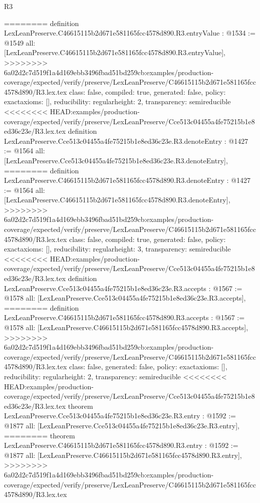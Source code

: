 \begin{lexlean}{R3}
\begin{coremodule}
{{{{{{{{{{{========
definition LexLeanPreserve.C46615115b2d671e581165fcc4578d890.R3.entryValue : @1534 := @1549 {
  all: [LexLeanPreserve.C46615115b2d671e581165fcc4578d890.R3.entryValue],
>>>>>>>> 6a02d2c7d519f1a4d169ebb3496fbad51bd259cb:examples/production-coverage/expected/verify/preserve/LexLeanPreserve/C46615115b2d671e581165fcc4578d890/R3.lex.tex
  class: false,
  compiled: true,
  generated: false,
  policy: exact{axioms: []},
  reducibility: regular{height: 2},
  transparency: semireducible
}
<<<<<<<< HEAD:examples/production-coverage/expected/verify/preserve/LexLeanPreserve/Cce513c04455a4fe75215b1e8ed36c23e/R3.lex.tex
definition LexLeanPreserve.Cce513c04455a4fe75215b1e8ed36c23e.R3.denoteEntry : @1427 := @1564 {
  all: [LexLeanPreserve.Cce513c04455a4fe75215b1e8ed36c23e.R3.denoteEntry],
========
definition LexLeanPreserve.C46615115b2d671e581165fcc4578d890.R3.denoteEntry : @1427 := @1564 {
  all: [LexLeanPreserve.C46615115b2d671e581165fcc4578d890.R3.denoteEntry],
>>>>>>>> 6a02d2c7d519f1a4d169ebb3496fbad51bd259cb:examples/production-coverage/expected/verify/preserve/LexLeanPreserve/C46615115b2d671e581165fcc4578d890/R3.lex.tex
  class: false,
  compiled: true,
  generated: false,
  policy: exact{axioms: []},
  reducibility: regular{height: 3},
  transparency: semireducible
}
<<<<<<<< HEAD:examples/production-coverage/expected/verify/preserve/LexLeanPreserve/Cce513c04455a4fe75215b1e8ed36c23e/R3.lex.tex
definition LexLeanPreserve.Cce513c04455a4fe75215b1e8ed36c23e.R3.accepts : @1567 := @1578 {
  all: [LexLeanPreserve.Cce513c04455a4fe75215b1e8ed36c23e.R3.accepts],
========
definition LexLeanPreserve.C46615115b2d671e581165fcc4578d890.R3.accepts : @1567 := @1578 {
  all: [LexLeanPreserve.C46615115b2d671e581165fcc4578d890.R3.accepts],
>>>>>>>> 6a02d2c7d519f1a4d169ebb3496fbad51bd259cb:examples/production-coverage/expected/verify/preserve/LexLeanPreserve/C46615115b2d671e581165fcc4578d890/R3.lex.tex
  class: false,
  generated: false,
  policy: exact{axioms: []},
  reducibility: regular{height: 2},
  transparency: semireducible
}
<<<<<<<< HEAD:examples/production-coverage/expected/verify/preserve/LexLeanPreserve/Cce513c04455a4fe75215b1e8ed36c23e/R3.lex.tex
theorem LexLeanPreserve.Cce513c04455a4fe75215b1e8ed36c23e.R3.entry : @1592 := @1877 {
  all: [LexLeanPreserve.Cce513c04455a4fe75215b1e8ed36c23e.R3.entry],
========
theorem LexLeanPreserve.C46615115b2d671e581165fcc4578d890.R3.entry : @1592 := @1877 {
  all: [LexLeanPreserve.C46615115b2d671e581165fcc4578d890.R3.entry],
>>>>>>>> 6a02d2c7d519f1a4d169ebb3496fbad51bd259cb:examples/production-coverage/expected/verify/preserve/LexLeanPreserve/C46615115b2d671e581165fcc4578d890/R3.lex.tex
}}}}}}}}}}}}}}}
\end{coremodule}
\end{lexlean}
